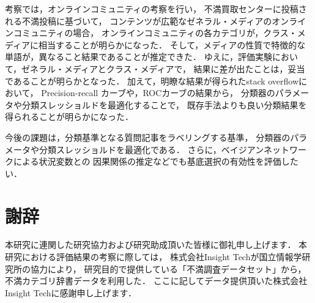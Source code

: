 \documentclass[12pt,a4paper,twocolumn,twoside]{jsik}
\begin{document}
考察では，オンラインコミュニティの考察を行い，
不満買取センターに投稿される不満投稿に基づいて，
コンテンツが広範なゼネラル・メディアのオンラインコミュニティの場合，
オンラインコミュニティの各カテゴリが，クラス・メディアに相当することが明らかになった．
%
そして，メディアの性質で特徴的な単語が，異なること結果であることが推定できた．
ゆえに，評価実験において，ゼネラル・メディアとクラス・メディアで，
結果に差が出たことは，妥当であることが明らかとなった．
%
加えて，明瞭な結果が得られたstack overflowにおいて，
Precision-recall カーブや，ROCカーブの結果から，
分類器のパラメータや分類スレッショルドを最適化することで，
既存手法よりも良い分類結果を得られることが明らかになった．

今後の課題は，分類基準となる質問記事をラベリングする基準，
分類器のパラメータや分類スレッショルドを最適化である．
さらに，ベイジアンネットワークによる状況変数との
因果関係の推定などでも基底選択の有効性を評価したい．

\section{謝辞}
本研究に連関した研究協力および研究助成頂いた皆様に御礼申し上げます．
本研究における評価結果の考察に際しては，
株式会社Insight Techが国立情報学研究所の協力により，
研究目的で提供している「不満調査データセット」から，
不満カテゴリ辞書データを利用した．
ここに記してデータ提供頂いた株式会社Insight Techに感謝申し上げます．

%




\end{document}

